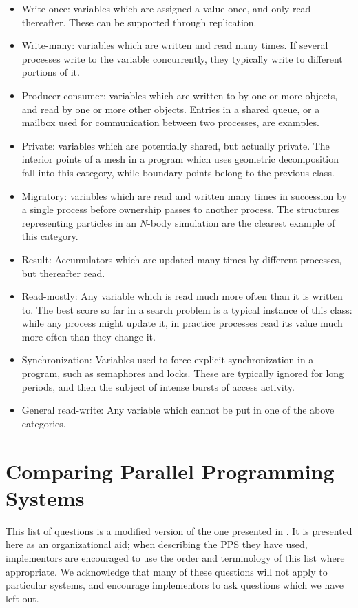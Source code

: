 \begin{itemize}
\item	Write-once:
	variables which are assigned a value once, and only read thereafter.
	These can be supported through replication.
\item	Write-many:
	variables which are written and read many times.
	If several processes write to the variable concurrently, they typically write to different portions of it.
\item	Producer-consumer:
	variables which are written to by one or more objects, and read by one or more other objects.
	Entries in a shared queue, or a mailbox used for communication between two processes, are examples.
\item	Private:
	variables which are potentially shared, but actually private.
	The interior points of a mesh in a program which uses geometric decomposition fall into this category,
	while boundary points belong to the previous class.
\item	Migratory:
	variables which are read and written many times in succession by a single process before ownership passes to another process.
	The structures representing particles in an $N$-body simulation are the clearest example of this category.
\item	Result:
	Accumulators which are updated many times by different processes, but thereafter read.
\item	Read-mostly:
	Any variable which is read much more often than it is written to.
	The best score so far in a search problem is a typical instance of this class:
	while any process might update it, in practice processes read its value much more often than they change it.
\item	Synchronization:
	Variables used to force explicit synchronization in a program, such as semaphores and locks.
	These are typically ignored for long periods, and then the subject of intense bursts of access activity.
\item	General read-write:
	Any variable which cannot be put in one of the above categories.
\end{itemize}

\newpage
\section{Comparing Parallel Programming Systems\label{s:questions}}

This list of questions is a modified version of the one presented in \cite{b:compare-ada-c-pascal}.
It is presented here as an organizational aid;
when describing the PPS they have used,
implementors are encouraged to use the order and terminology of this list where appropriate.
We acknowledge that many of these questions will not apply to particular systems,
and encourage implementors to ask questions which we have left out.

